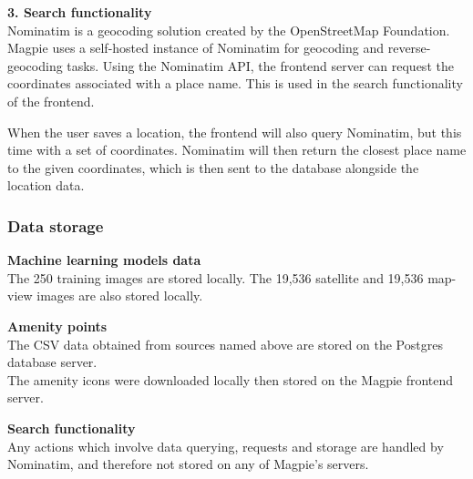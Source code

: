 \textbf{3. Search functionality}\\
Nominatim is a geocoding solution created by the OpenStreetMap Foundation. Magpie uses a self-hosted instance of Nominatim for geocoding and reverse-geocoding tasks. Using the Nominatim API, the frontend server can request the coordinates associated with a place name. This is used in the search functionality of the frontend.

When the user saves a location, the frontend will also query Nominatim, but this
time with a set of coordinates. Nominatim will then return the closest place
name to the given coordinates, which is then sent to the database alongside the
location data.

\subsubsection{Data storage}
\textbf{Machine learning models data}\\
The 250 training images are stored locally.
The 19,536 satellite and 19,536 map-view images are also stored locally.

\textbf{Amenity points}\\
The CSV data obtained from sources named above are stored on the Postgres database server.\\
The amenity icons were downloaded locally then stored on the Magpie frontend server.

\textbf{Search functionality}\\
Any actions which involve data querying, requests and storage are handled by Nominatim, and therefore not stored on any of Magpie's servers.
